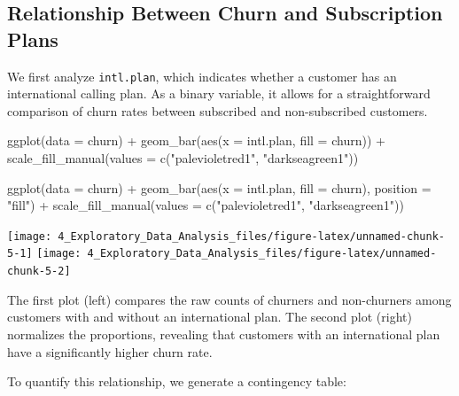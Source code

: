 \documentclass[
  11pt,
]{book}
\makeatletter
\newenvironment{Shaded}{}{}
\newcommand{\AttributeTok}[1]{#1}
\newcommand{\DecValTok}[1]{#1}
\newcommand{\FunctionTok}[1]{#1}
\newcommand{\NormalTok}[1]{#1}
\newcommand{\SpecialCharTok}[1]{\textcolor[rgb]{0.39,0.39,0.39}{#1}}
\newcommand{\StringTok}[1]{\textcolor[rgb]{0.39,0.39,0.39}{#1}}
\newenvironment{kframe}{%
\medskip{}
\setlength{\fboxsep}{.8em}
 \def\at@end@of@kframe{}%
 \ifinner\ifhmode%
  \def\at@end@of@kframe{\end{minipage}}%
  \begin{minipage}{\columnwidth}%
 \fi\fi%
 \def\FrameCommand##1{\hskip\@totalleftmargin \hskip-\fboxsep
 \colorbox{shadecolor}{##1}\hskip-\fboxsep
     \hskip-\linewidth \hskip-\@totalleftmargin \hskip\columnwidth}%
 \MakeFramed {\advance\hsize-\width
   \@totalleftmargin\z@ \linewidth\hsize
   \@setminipage}}%
 {\par\unskip\endMakeFramed%
 \at@end@of@kframe}
\renewenvironment{Shaded}{\begin{kframe}}{\end{kframe}}
\theoremstyle{definition}
\theoremstyle{definition}
\theoremstyle{definition}
\theoremstyle{definition}
\theoremstyle{remark}
\makeatother
\begin{document}
\subsection*{Relationship Between Churn and Subscription Plans}\label{relationship-between-churn-and-subscription-plans}


We first analyze \texttt{intl.plan}, which indicates whether a customer has an international calling plan. As a binary variable, it allows for a straightforward comparison of churn rates between subscribed and non-subscribed customers.

\begin{Shaded}
\begin{Highlighting}[]
\FunctionTok{ggplot}\NormalTok{(}\AttributeTok{data =}\NormalTok{ churn) }\SpecialCharTok{+} 
  \FunctionTok{geom\_bar}\NormalTok{(}\FunctionTok{aes}\NormalTok{(}\AttributeTok{x =}\NormalTok{ intl.plan, }\AttributeTok{fill =}\NormalTok{ churn)) }\SpecialCharTok{+}
  \FunctionTok{scale\_fill\_manual}\NormalTok{(}\AttributeTok{values =} \FunctionTok{c}\NormalTok{(}\StringTok{"palevioletred1"}\NormalTok{, }\StringTok{"darkseagreen1"}\NormalTok{)) }

\FunctionTok{ggplot}\NormalTok{(}\AttributeTok{data =}\NormalTok{ churn) }\SpecialCharTok{+} 
  \FunctionTok{geom\_bar}\NormalTok{(}\FunctionTok{aes}\NormalTok{(}\AttributeTok{x =}\NormalTok{ intl.plan, }\AttributeTok{fill =}\NormalTok{ churn), }\AttributeTok{position =} \StringTok{"fill"}\NormalTok{) }\SpecialCharTok{+}
  \FunctionTok{scale\_fill\_manual}\NormalTok{(}\AttributeTok{values =} \FunctionTok{c}\NormalTok{(}\StringTok{"palevioletred1"}\NormalTok{, }\StringTok{"darkseagreen1"}\NormalTok{)) }
\end{Highlighting}
\end{Shaded}

\texttt{[image: 4\_Exploratory\_Data\_Analysis\_files/figure-latex/unnamed-chunk-5-1]} \texttt{[image: 4\_Exploratory\_Data\_Analysis\_files/figure-latex/unnamed-chunk-5-2]}

The first plot (left) compares the raw counts of churners and non-churners among customers with and without an international plan. The second plot (right) normalizes the proportions, revealing that customers with an international plan have a significantly higher churn rate.

To quantify this relationship, we generate a contingency table:

\begin{Shaded}
\end{Shaded}
\end{document}
